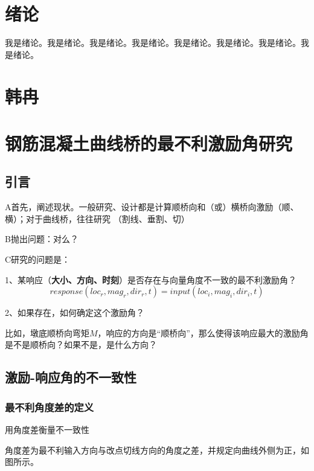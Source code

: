 \documentclass{bjtuthesis}
\begin{document}
\cover
\myclpage
\ccopyright
\myclpage
\setcounter{page}{1}
\ctitlepage
\myclpage
\thankspage
\myclpage
\cabspage
\myfanpage
\eabspage
\myfanpage
\cprepage
\myfanpage
\pagestyle{myfancy}
\tableofcontents
\chapter{绪论}
\setcounter{page}{1}
我是绪论。我是绪论。我是绪论。我是绪论。我是绪论。我是绪论。我是绪论。我是绪论。
\chapter{韩冉}
\chapter{钢筋混凝土曲线桥的最不利激励角研究}
\section{引言}
A首先，阐述现状。一般研究、设计都是计算顺桥向和（或）横桥向激励（顺、横）；对于曲线桥，往往研究
（割线、垂割、切）

B抛出问题：对么？


C研究的问题是：

1、某响应（{\bf 大小、方向、时刻}）是否存在与向量角度不一致的最不利激励角？
\begin{equation}
response(loc_r,mag_r,dir_r,t)=input(loc_i,mag_i,dir_i,t)
\end{equation}

2、如果存在，如何确定这个激励角？


比如，墩底顺桥向弯矩$M$，响应的方向是“顺桥向”，那么使得该响应最大的激励角是不是顺桥向？如果不是，是什么方向？

\section{激励-响应角的不一致性}
\subsection{最不利角度差的定义}
用角度差衡量不一致性

角度差为最不利输入方向与改点切线方向的角度之差，并规定向曲线外侧为正，如图所示。
\end{document}
